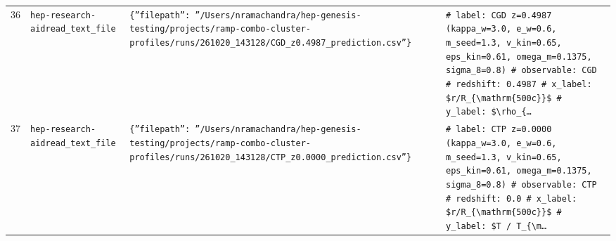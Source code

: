 \documentclass[11pt,a4paper]{article}
\begin{document}
\begin{longtable}{@{}p{}p{}p{}p{}@{}}
36 & \texttt{hep-research-aid}\newline\texttt{read\_\allowbreak{}text\_\allowbreak{}file} & \texttt{\{''filepath'':\allowbreak{} ''/\allowbreak{}Users/\allowbreak{}nramachandra/\allowbreak{}hep-genesis-testing/\allowbreak{}projects/\allowbreak{}ramp-combo-cluster-profiles/\allowbreak{}runs/\allowbreak{}261020\_\allowbreak{}143128/\allowbreak{}CGD\_\allowbreak{}z0.4987\_\allowbreak{}prediction.csv''\}\allowbreak{}} & \texttt{\# label:\allowbreak{} CGD z=\allowbreak{}0.4987 (kappa\_\allowbreak{}w=\allowbreak{}3.0,\allowbreak{} e\_\allowbreak{}w=\allowbreak{}0.6,\allowbreak{} m\_\allowbreak{}seed=\allowbreak{}1.3,\allowbreak{} v\_\allowbreak{}kin=\allowbreak{}0.65,\allowbreak{} eps\_\allowbreak{}kin=\allowbreak{}0.61,\allowbreak{} omega\_\allowbreak{}m=\allowbreak{}0.1375,\allowbreak{} sigma\_\allowbreak{}8=\allowbreak{}0.8)\allowbreak{} \# observable:\allowbreak{} CGD \# redshift:\allowbreak{} 0.4987 \# x\_\allowbreak{}label:\allowbreak{} \$r/\allowbreak{}R\_\allowbreak{}\{\textbackslash{}\allowbreak{}mathrm\{500c\}\allowbreak{}\}\allowbreak{}\$ \# y\_\allowbreak{}label:\allowbreak{} \$\textbackslash{}\allowbreak{}rho\_\allowbreak{}\{\ldots{}\allowbreak{}} \\
37 & \texttt{hep-research-aid}\newline\texttt{read\_\allowbreak{}text\_\allowbreak{}file} & \texttt{\{''filepath'':\allowbreak{} ''/\allowbreak{}Users/\allowbreak{}nramachandra/\allowbreak{}hep-genesis-testing/\allowbreak{}projects/\allowbreak{}ramp-combo-cluster-profiles/\allowbreak{}runs/\allowbreak{}261020\_\allowbreak{}143128/\allowbreak{}CTP\_\allowbreak{}z0.0000\_\allowbreak{}prediction.csv''\}\allowbreak{}} & \texttt{\# label:\allowbreak{} CTP z=\allowbreak{}0.0000 (kappa\_\allowbreak{}w=\allowbreak{}3.0,\allowbreak{} e\_\allowbreak{}w=\allowbreak{}0.6,\allowbreak{} m\_\allowbreak{}seed=\allowbreak{}1.3,\allowbreak{} v\_\allowbreak{}kin=\allowbreak{}0.65,\allowbreak{} eps\_\allowbreak{}kin=\allowbreak{}0.61,\allowbreak{} omega\_\allowbreak{}m=\allowbreak{}0.1375,\allowbreak{} sigma\_\allowbreak{}8=\allowbreak{}0.8)\allowbreak{} \# observable:\allowbreak{} CTP \# redshift:\allowbreak{} 0.0 \# x\_\allowbreak{}label:\allowbreak{} \$r/\allowbreak{}R\_\allowbreak{}\{\textbackslash{}\allowbreak{}mathrm\{500c\}\allowbreak{}\}\allowbreak{}\$ \# y\_\allowbreak{}label:\allowbreak{} \$T /\allowbreak{} T\_\allowbreak{}\{\textbackslash{}\allowbreak{}m\ldots{}\allowbreak{}} \\

\end{longtable}
\end{document}
